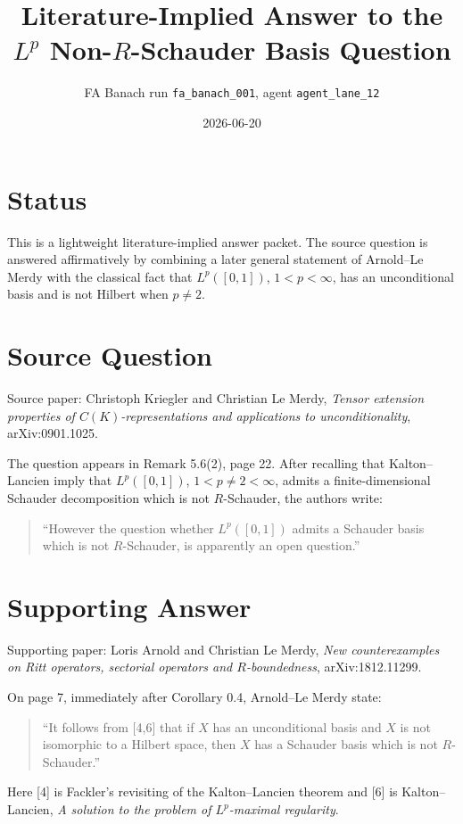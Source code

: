 \documentclass[11pt]{article}
\title{Literature-Implied Answer to the \(L^p\) Non-\(R\)-Schauder Basis Question}
\author{FA Banach run \texttt{fa\_banach\_001}, agent \texttt{agent\_lane\_12}}
\date{2026-06-20}
\begin{document}
\maketitle

\section*{Status}

This is a lightweight literature-implied answer packet. The source question is
answered affirmatively by combining a later general statement of
Arnold--Le Merdy with the classical fact that \(L^p([0,1])\), \(1<p<\infty\),
has an unconditional basis and is not Hilbert when \(p\neq2\).

\section*{Source Question}

Source paper:
Christoph Kriegler and Christian Le Merdy,
\emph{Tensor extension properties of \(C(K)\)-representations and applications
to unconditionality}, arXiv:0901.1025.

The question appears in Remark 5.6(2), page 22. After recalling that
Kalton--Lancien imply that \(L^p([0,1])\), \(1<p\neq2<\infty\), admits a
finite-dimensional Schauder decomposition which is not \(R\)-Schauder, the
authors write:
\begin{quote}
``However the question whether \(L^p([0,1])\) admits a Schauder basis which is
not \(R\)-Schauder, is apparently an open question.''
\end{quote}

\section*{Supporting Answer}

Supporting paper:
Loris Arnold and Christian Le Merdy,
\emph{New counterexamples on Ritt operators, sectorial operators and
\(R\)-boundedness}, arXiv:1812.11299.

On page 7, immediately after Corollary 0.4, Arnold--Le Merdy state:
\begin{quote}
``It follows from [4,6] that if \(X\) has an unconditional basis and \(X\) is
not isomorphic to a Hilbert space, then \(X\) has a Schauder basis which is not
\(R\)-Schauder.''
\end{quote}
Here [4] is Fackler's revisiting of the Kalton--Lancien theorem and [6] is
Kalton--Lancien, \emph{A solution to the problem of \(L^p\)-maximal regularity}.
\end{document}
